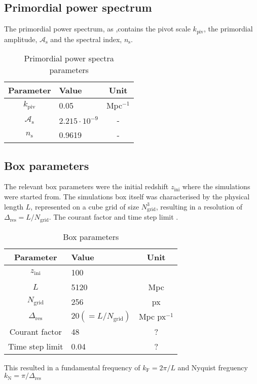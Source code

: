     \subsection{Primordial power spectrum} 
    The primordial power spectrum, as ,contains the pivot scale $k_\mathrm{piv}$, the primordial amplitude, $\mathcal{A}_\mathrm{s}$ and the spectral index, $n_\mathrm{s}$.
        \begin{table}[h]\label{tab:simulations_primordial_parameters}
            \centering
            \caption{Primordial power spectra parameters}
            \begin{tabular}{c|l|c}
                \toprule
                \textbf{Parameter} & \textbf{Value} & \textbf{Unit} \\
                \midrule
                $k_\mathrm{piv}$ & 0.05 & Mpc$^{-1}$ \\
                $\mathcal{A}_\mathrm{s}$ & $2.215\cdot 10^{-9}$ & -\\
                $n_\mathrm{s}$ & 0.9619 & - \\
                \bottomrule
            \end{tabular}
        \end{table}

    \subsection{Box parameters}
    The relevant box parameters were the initial redshift $z_\mathrm{ini}$ where the simulations were started from. The simulations box itself was characterised by the physical length $L$, represented on a cube grid of size $N_\mathrm{grid}^3$, resulting in a resolution of $\Delta_\mathrm{res} = L/N_\mathrm{grid}$. The courant factor  and time step limit .
        \begin{table}[h]\label{tab:simulations_box_parameters}
            \centering
            \caption{Box parameters}
            \begin{tabular}{c|l|c}
                \toprule
                \textbf{Parameter} & \textbf{Value} & \textbf{Unit} \\
                \midrule
                $z_\mathrm{ini}$ & 100 &\\
                $L$ & 5120 & Mpc\\
                $N_\mathrm{grid}$ & 256 & px \\
                $\Delta_\mathrm{res}$ & $20 (=L/N_\mathrm{grid})$ & Mpc px$^{-1}$\\
                Courant factor & 48 & ? \\
                Time step limit & 0.04 & ? \\
                \bottomrule
            \end{tabular}
        \end{table}
        This resulted in a fundamental frequency of $k_\mathrm{F} = 2\pi/L$ and Nyquist freguency $k_\mathrm{N} = \pi/\Delta_\mathrm{res}$ 

